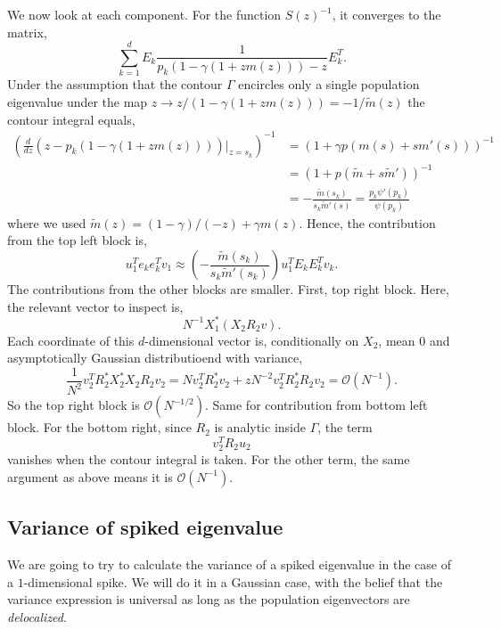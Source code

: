 \documentclass[11 pt, reqno]{article}
\def\beq{\begin{equation}}
\def\eeq{\end{equation}}
\def\O{\mathcal{O}}
\begin{document}
We now look at each component.  For the function $S(z)^{-1}$, it converges to the matrix,
\beq
\sum_{k=1}^d E_k \frac{1}{ p_k(1 - \gamma (1 +z m(z) ) ) - z } E_k^T.
\eeq
Under the assumption that the contour $\Gamma$ encircles only a single population eigenvalue under the map $z \to z / ( 1 - \gamma (1 + z m (z) ) ) = - 1 / \tilde{m} (z) $ the contour integral equals,
\begin{align}
\left( \frac{d}{dz} (z - p_k (1 - \gamma (1+ zm(z) ) )) \bigg\vert_{z = s_k } \right)^{-1} &=\left( 1 + \gamma p (m(s) + s m' (s) ) \right)^{-1} \\
&= \left( 1 + p ( \tilde{m} + s \tilde{m}' ) \right)^{-1} \\
& = - \frac{ \tilde{m} (s_k ) }{ s_k \tilde{m}' (s) } =  \frac{ p_k \psi' ( p_k ) }{ \psi ( p_k ) }
\end{align}
where we used $\tilde{m} (z) = (1-\gamma ) / (-z) + \gamma m (z)$.  Hence, the contribution from the top left block is,
\beq
u_1^T e_k e_k^T v_1 \approx \left( - \frac{ \tilde{m} (s_k ) }{ s_k \tilde{m}' ( s_k ) } \right) u_1^T E_k E_k^T v_k.
\eeq
The contributions from the other blocks are smaller.  First, top right block.  Here, the relevant vector to inspect is,
\beq
N^{-1} X_1^* ( X_2 R_2 v).
\eeq
Each coordinate of this $d$-dimensional vector is, conditionally on $X_2$, mean $0$ and asymptotically Gaussian distributioend with variance,
\beq
\frac{1}{N^2} v_2^T R^*_2 X_2^*X_2 R_2 v_2 = N v_2^T R_2^* v_2 + z N^{-2} v_2^T R_2^* R_2 v_2 = \O (N^{-1} ).
\eeq
So the top right block is $\O(N^{-1/2})$.  Same for contribution from bottom left block.  For the bottom right, since $R_2$ is analytic inside $\Gamma$, the term
\beq
v_2^T R_2 u_2
\eeq
vanishes when the contour integral is taken.  For the other term, the same argument as above means it is $\O (N^{-1})$.  


\subsection{Variance of spiked eigenvalue}

We are going to try to calculate the variance of a spiked eigenvalue in the case of a $1$-dimensional spike.  We will do it in a Gaussian case, with the belief that the variance expression is universal as long as the population eigenvectors are \emph{delocalized}.  
\end{document}
